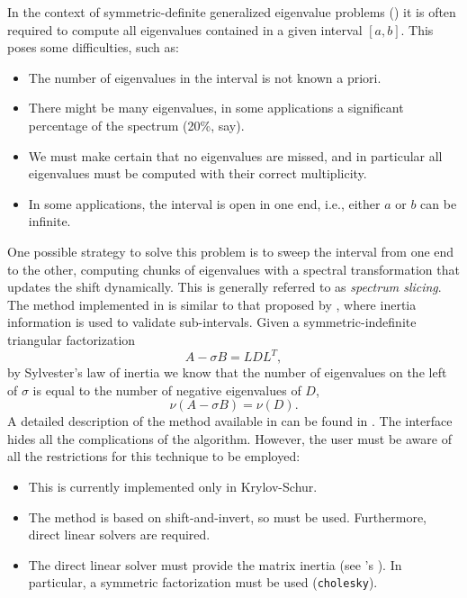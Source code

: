 In the context of symmetric-definite generalized eigenvalue problems () it is often required to compute all eigenvalues contained in a given interval $[a,b]$. This poses some difficulties, such as:
\begin{itemize}
\setlength{\itemsep}{0pt}
\item The number of eigenvalues in the interval is not known a priori.
\item There might be many eigenvalues, in some applications a significant percentage of the spectrum (20\%, say).
\item We must make certain that no eigenvalues are missed, and in particular all eigenvalues must be computed with their correct multiplicity.
\item In some applications, the interval is open in one end, i.e., either $a$ or $b$ can be infinite.
\end{itemize}
One possible strategy to solve this problem is to sweep the interval from one end to the other, computing chunks of eigenvalues with a spectral transformation that updates the shift dynamically. This is generally referred to as \emph{spectrum slicing}. The method implemented in \slepc is similar to that proposed by \cite{Grimes:1994:SBL}, where inertia information is used to validate sub-intervals. Given a symmetric-indefinite triangular factorization
\begin{equation}
A-\sigma B=LDL^T,
\end{equation}
by Sylvester's law of inertia we know that the number of eigenvalues on the left of $\sigma$ is equal to the number of negative eigenvalues of $D$,
\begin{equation}
\nu(A-\sigma B)=\nu(D).
\end{equation}
A detailed description of the method available in \slepc can be found in \citep{Campos:2012:SSS}.
The \slepc interface hides all the complications of the algorithm. However, the user must be aware of all the restrictions for this technique to be employed:
\begin{itemize}
\setlength{\itemsep}{0pt}
\item This is currently implemented only in Krylov-Schur.
\item The method is based on shift-and-invert, so  must be used. Furthermore, direct linear solvers are required.
\item The direct linear solver must provide the matrix inertia (see \petsc's ). In particular, a symmetric factorization must be used (\texttt{cholesky}).
\end{itemize}

